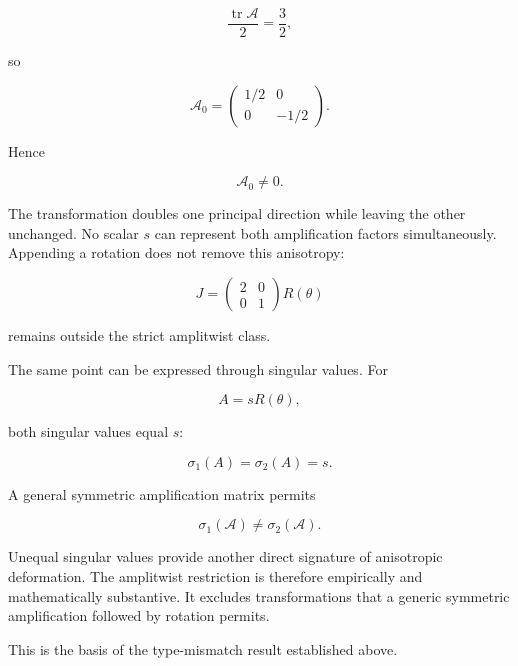 \documentclass[11pt]{article}
\begin{document}
\begin{equation}
\frac{\operatorname{tr}\mathcal A}{2}
=
\frac32,
\end{equation}

so

\begin{equation}
\mathcal A_0
=
\begin{pmatrix}
1/2&0\\
0&-1/2
\end{pmatrix}.
\end{equation}

Hence

\begin{equation}
\mathcal A_0\neq0.
\end{equation}

The transformation doubles one principal direction while leaving the other unchanged. No scalar $s$ can represent both amplification factors simultaneously. Appending a rotation does not remove this anisotropy:

\begin{equation}
J
=
\begin{pmatrix}
2&0\\
0&1
\end{pmatrix}
R(\theta)
\end{equation}

remains outside the strict amplitwist class.

The same point can be expressed through singular values. For

\begin{equation}
A=sR(\theta),
\end{equation}

both singular values equal $s$:

\begin{equation}
\sigma_1(A)=\sigma_2(A)=s.
\end{equation}

A general symmetric amplification matrix permits

\begin{equation}
\sigma_1(\mathcal A)\neq\sigma_2(\mathcal A).
\end{equation}

Unequal singular values provide another direct signature of anisotropic deformation. The amplitwist restriction is therefore empirically and mathematically substantive. It excludes transformations that a generic symmetric amplification followed by rotation permits.

This is the basis of the type-mismatch result established above.
\end{document}
